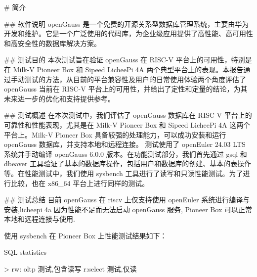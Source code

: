 \documentclass{article}
\begin{document}
\maketitle

\begin{abstract}
\end{abstract}

\thispagestyle{empty} %

\newpage
\tableofcontents

\newpage

\begin{markdown}
# 简介

## 软件说明
openGauss 是一个免费的开源关系型数据库管理系统，主要由华为开发和维护。它是一个广泛使用的代码库，为企业级应用提供了高性能、高可用性和高安全性的数据库解决方案。

## 测试目的
本次测试旨在验证 openGauss 在 RISC-V 平台上的可用性，特别是在 Milk-V Pioneer Box 和 Sipeed LicheePi 4A 两个典型平台上的表现。本报告通过手动测试的方法，从目前的平台兼容性及用户的日常使用体验两个角度评估了 openGauss 当前在 RISC-V 平台上的可用性，并给出了定性和定量的结论，为其未来进一步的优化和支持提供参考。

## 测试概述
在本次测试中，我们评估了 openGauss 数据库在 RISC-V 平台上的可靠性和性能表现，尤其是在 Milk-V Pioneer Box 和 Sipeed LicheePi 4A 这两个平台上。Milk-V Pioneer Box 具备较强的处理能力，可以成功安装和运行 openGauss 数据库，并支持本地和远程连接。
测试使用了 openEuler 24.03 LTS 系统并手动编译 openGauss 6.0.0 版本。在功能测试部分，我们首先通过 gsql 和 dbeaver 工具验证了基本的数据库操作，包括用户和数据库的创建、基本的表操作等。在性能测试中，我们使用 sysbench 工具进行了读写和只读性能测试。为了进行比较，也在 x86_64 平台上进行同样的测试。


## 测试总结
目前 openGauss 在 riscv 上仅支持使用 openEuler 系统进行编译与安装,licheepi 4a 因为性能不足而无法启动 openGauss 服务,
Pioneer Box 可以正常本地和远程连接与使用.

使用 sysbench 在 Pioneer Box 上性能测试结果如下：

SQL statistics

> rw: oltp 测试,包含读写 r:select 测试,仅读


\end{markdown}
\end{document}
